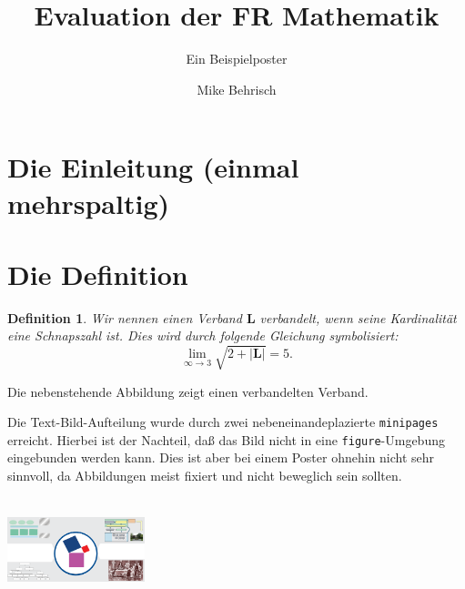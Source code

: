 \documentclass[a0paper,noDIN,Mathematik]{tudmathposter}
\author{Mike Behrisch}%
\title{Evaluation der FR Mathematik}
\subtitle{Ein Beispielposter}
\newtheorem{definition}{Definition}
\begin{document}
\maketitle
\setlength{\columnsep}{1.5cm}%
\setlength{\multicolsep}{0pt}%

\section{Die Einleitung (einmal mehrspaltig)}
\begin{multicols}{3}%
\lipsum[1]
\end{multicols}\vspace{3ex}

\section{Die Definition}
\begin{minipage}{0.7\textwidth}
  \begin{definition}
    Wir nennen einen Verband $\mathbf{L}$ \emph{verbandelt}, wenn seine Kardinalität eine Schnapszahl ist. Dies wird durch folgende Gleichung symbolisiert:
    \[\lim_{\infty \to 3}\sqrt{2 + |\mathbf{L}|} = 5.\]
  \end{definition}
  Die nebenstehende Abbildung zeigt einen verbandelten Verband.\par

 Die Text-Bild-Aufteilung wurde durch zwei nebeneinandeplazierte \texttt{minipages} erreicht. Hierbei ist der Nachteil, daß das Bild nicht in eine \texttt{figure}-Umgebung eingebunden werden kann. Dies ist aber bei einem Poster  ohnehin nicht sehr sinnvoll, da Abbildungen meist fixiert und nicht beweglich sein sollten.
\end{minipage}
\begin{minipage}{0.3\textwidth}
  \centering
  \includegraphics*[keepaspectratio,width=0.3\textwidth,height=3cm,angle=30]{image2}
\end{minipage}\vspace{3ex}
\end{document}
